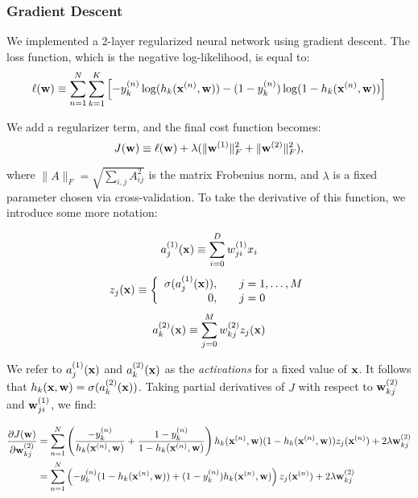 \subsubsection{Gradient Descent}
We implemented a 2-layer regularized neural network using gradient descent.  The loss function, which is the negative log-likelihood, is equal to:
\begin{equation}
\ell(\boldsymbol{\mathbf{w}}) \equiv \sum_{n=1}^{N} \sum_{k=1}^{K} \left[ -y_k^{(n)} \log(h_{k}(\boldsymbol{\mathbf{x}}^{(n)}, \boldsymbol{\mathbf{w}})) - (1-y_k^{(n)}) \log(1 - h_{k}(\boldsymbol{\mathbf{x}}^{(n)}, \boldsymbol{\mathbf{w}}))\right]
\end{equation}

We add a regularizer term, and the final cost function becomes:
\begin{equation}
J(\boldsymbol{\mathbf{w}}) \equiv \ell(\boldsymbol{\mathbf{w}}) + \lambda(\|\boldsymbol{\mathbf{w}}^{(1)}\|^2_F + \|\boldsymbol{\mathbf{w}}^{(2)}\|^2_F),
\end{equation}

where $\|A\|_F = \sqrt{\sum_{i,j} A^2_{ij}}$ is the matrix Frobenius norm, and $\lambda$ is a fixed parameter chosen via cross-validation.  To take the derivative of this function, we introduce some more notation:

\begin{equation}
a^{(1)}_j(\boldsymbol{\mathbf{x}}) \equiv \sum_{i=0}^D w_{ji}^{(1)} x_i
\end{equation}
\begin{equation}
z_j(\boldsymbol{\mathbf{x}}) \equiv \left\{\begin{array}{rl}
\sigma(a^{(1)}_j(\boldsymbol{\mathbf{x}})), & ~~~ j = 1,\ldots, M\\
0, & ~~~j = 0 \end{array} \right.
\end{equation}
\begin{equation}
a^{(2)}_k(\boldsymbol{\mathbf{x}}) \equiv \sum_{j=0}^M w_{kj}^{(2)} z_j(\boldsymbol{\mathbf{x}})
\end{equation}

We refer to $a^{(1)}_j(\boldsymbol{\mathbf{x}})$ and $a^{(2)}_k(\boldsymbol{\mathbf{x}})$ as the \emph{activations} for a fixed value of $\boldsymbol{\mathbf{x}}$.  It follows that $h_{k}(\boldsymbol{\mathbf{x}},\boldsymbol{\mathbf{w}}) = \sigma(a^{(2)}_k(\boldsymbol{\mathbf{x}}))$.  Taking partial derivatives of $J$ with respect to $\boldsymbol{\mathbf{w}}^{(2)}_{kj}$ and $\boldsymbol{\mathbf{w}}^{(1)}_{ji}$, we find:  

\begin{align}
\frac{\partial J(\boldsymbol{\mathbf{w}})}{\partial \boldsymbol{\mathbf{w}}^{(2)}_{kj}} &= \sum_{n=1}^{N} \left(\frac{-y_k^{(n)}}{h_k(\boldsymbol{\mathbf{x}}^{(n)},\boldsymbol{\mathbf{w}})} +  \frac{1-y_k^{(n)}}{1 - h_k(\boldsymbol{\mathbf{x}}^{(n)},\boldsymbol{\mathbf{w}})}\right) h_k(\boldsymbol{\mathbf{x}}^{(n)},\boldsymbol{\mathbf{w}}) (1 - h_k(\boldsymbol{\mathbf{x}}^{(n)},\boldsymbol{\mathbf{w}})) z_j(\boldsymbol{\mathbf{x}}^{(n)}) + 2 \lambda \boldsymbol{\mathbf{w}}^{(2)}_{kj}\\
&= \sum_{n=1}^{N} \left(-y_k^{(n)}(1 - h_k(\boldsymbol{\mathbf{x}}^{(n)},\boldsymbol{\mathbf{w}})) + (1-y_k^{(n)})h_k(\boldsymbol{\mathbf{x}}^{(n)},\boldsymbol{\mathbf{w}}) \right) z_j(\boldsymbol{\mathbf{x}}^{(n)}) + 2 \lambda \boldsymbol{\mathbf{w}}^{(2)}_{kj}
\end{align}

